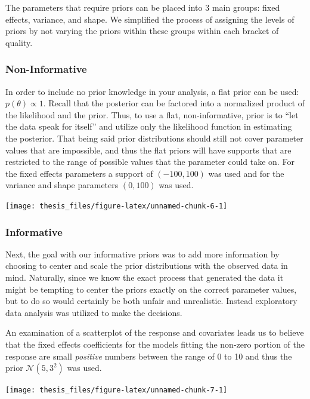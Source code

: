 \documentclass[12pt,twoside]{reedthesis}
\begin{document}
The parameters that require priors can be placed into 3 main groups: fixed effects, variance, and shape. We simplified the process of assigning the levels of priors by not varying the priors within these groups within each bracket of quality.

\hypertarget{non-informative}{%
\subsubsection{Non-Informative}\label{non-informative}}

In order to include no prior knowledge in your analysis, a flat prior can be used: \(p(\theta) \propto 1\). Recall that the posterior can be factored into a normalized product of the likelihood and the prior. Thus, to use a flat, non-informative, prior is to ``let the data speak for itself'' and utilize only the likelihood function in estimating the posterior. That being said prior distributions should still not cover parameter values that are impossible, and thus the flat priors will have supports that are restricted to the range of possible values that the parameter could take on. For the fixed effects parameters a support of \((-100, 100)\) was used and for the variance and shape parameters \((0, 100)\) was used.
\begin{center}\texttt{[image: thesis\_files/figure-latex/unnamed-chunk-6-1]} \end{center}

\hypertarget{info}{%
\subsubsection{Informative}\label{info}}

Next, the goal with our informative priors was to add more information by choosing to center and scale the prior distributions with the observed data in mind. Naturally, since we know the exact process that generated the data it might be tempting to center the priors exactly on the correct parameter values, but to do so would certainly be both unfair and unrealistic. Instead exploratory data analysis was utilized to make the decisions.

An examination of a scatterplot of the response and covariates leads us to believe that the fixed effects coefficients for the models fitting the non-zero portion of the response are small \emph{positive} numbers between the range of 0 to 10 and thus the prior \(\mathcal{N}(5, 3^2)\) was used.
\begin{center}\texttt{[image: thesis\_files/figure-latex/unnamed-chunk-7-1]} \end{center}
\end{document}
